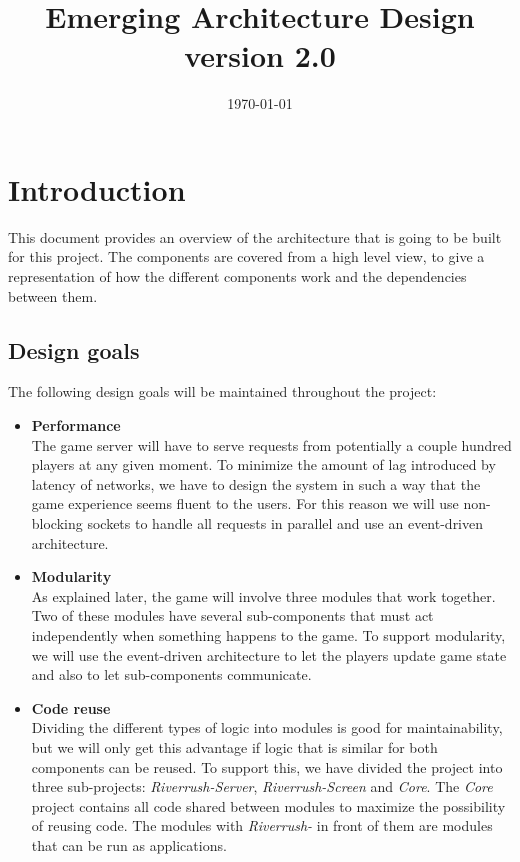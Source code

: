 \documentclass[11pt,a4paper]{article}
\begin{document}
\setlength{\droptitle}{-5em}
\title{
Emerging Architecture Design\\ 
version 2.0
}
\date{\today}
\maketitle

\section{Introduction}
This document provides an overview of the architecture that is going to be built for this project. The components are covered from a high level view, to give a representation of how the different components work and the dependencies between them.

\subsection{Design goals}
The following design goals will be maintained throughout the project:
\begin{itemize}
\item
\textbf{Performance}\\
The game server will have to serve requests from  potentially a couple hundred players at any given moment. To minimize the amount of lag introduced by latency of networks, we have to design the system in such a way that the game experience seems fluent to the users. For this reason we will use non-blocking sockets to handle all requests in parallel and use an event-driven architecture.

\item
\textbf{Modularity} \\
As explained later, the game will involve three modules that work together. Two of these modules have several sub-components that must act independently when something happens to the game. To support modularity, we will use the event-driven architecture to let the players update game state and also to let sub-components communicate.

\item
\textbf{Code reuse}\\
Dividing the different types of logic into modules is good for maintainability, but we will only get this advantage if logic that is similar for both components can be reused. To support this, we have divided the project into three sub-projects: \emph{Riverrush-Server}, \emph{Riverrush-Screen} and \emph{Core}. The \emph{Core} project contains all code shared between modules to maximize the possibility of reusing code. The modules with \emph{Riverrush-} in front of them are modules that can be run as applications.

\end{itemize}
\end{document}
